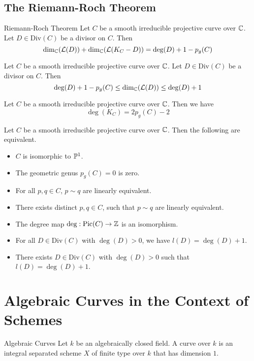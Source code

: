 \documentclass[a4paper]{article}
\begin{document}
\subsection{The Riemann-Roch Theorem}
\begin{thm}{Riemann-Roch Theorem}{} Let $C$ be a smooth irreducible projective curve over $\mathbb{C}$. Let $D\in\text{Div}(C)$ be a divisor on $C$. Then $$\dim_{\mathbb{C}}(\mathcal{L}(D))+\dim_{\mathbb{C}}(\mathcal{L}(K_C-D))=\deg(D)+1-p_g(C)$$
\end{thm}

\begin{prp}{}{} Let $C$ be a smooth irreducible projective curve over $\mathbb{C}$. Let $D\in\text{Div}(C)$ be a divisor on $C$. Then $$\deg(D)+1-p_g(C)\leq\dim_{\mathbb{C}}(\mathcal{L}(D))\leq\deg(D)+1$$
\end{prp}

\begin{prp}{}{} Let $C$ be a smooth irreducible projective curve over $\mathbb{C}$. Then we have $$\deg(K_C)=2p_g(C)-2$$
\end{prp}

\begin{prp}{}{} Let $C$ be a smooth irreducible projective curve over $\mathbb{C}$. Then the following are equivalent. 
\begin{itemize}
\item $C$ is isomorphic to $\mathbb{P}^1$. 
\item The geometric genus $p_g(C)=0$ is zero. 
\item For all $p,q\in C$, $p\sim q$ are linearly equivalent. 
\item There exists distinct $p,q\in C$, such that $p\sim q$ are linearly equivalent. 
\item The degree map $\deg:\text{Pic}(C)\to\mathbb{Z}$ is an isomorphism. 
\item For all $D\in\text{Div}(C)$ with $\deg(D)>0$, we have $l(D)=\deg(D)+1$. 
\item There exists $D\in\text{Div}(C)$ with $\deg(D)>0$ such that $l(D)=\deg(D)+1$. 
\end{itemize}
\end{prp}


\pagebreak
\section{Algebraic Curves in the Context of Schemes}
\begin{defn}{Algebraic Curves}{} Let $k$ be an algebraically closed field. A curve over $k$ is an integral separated scheme $X$ of finite type over $k$ that has dimension $1$. 
\end{defn}
\end{document}
